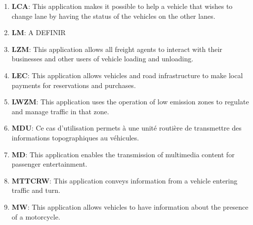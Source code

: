 \begin{enumerate}
\item \textbf{\acrfull{LCA}}: This application makes it possible to help a vehicle that wishes to change lane by having the status of the vehicles on the other lanes. \cite{etsi_etsi_tr_102_638_intelligent_2009,papadimitratos_vehicular_2009,brown_review_2019,boban_use_2017,al-sultan_comprehensive_2014,karagiannis_vehicular_2011,chang_intelligent_2010,cailean_survey_2014,zeadally_tutorial_2020,bila_vehicles_2017,usdt_intelligent_2021}
\item \textbf{\acrfull{LM}}: A DEFINIR \cite{dar_wireless_2010,usdt_intelligent_2021}
\item \textbf{\acrfull{LZM}}: This application allows all freight agents to interact with their businesses and other users of vehicle loading and unloading. \cite{etsi_etsi_tr_102_638_intelligent_2009}
\item \textbf{\acrfull{LEC}}: This application allows vehicles and road infrastructure to make local payments for reservations and purchases. \cite{etsi_etsi_tr_102_638_intelligent_2009}
\item \textbf{\acrfull{LWZM}}: This application uses the operation of low emission zones to regulate and manage traffic in that zone. \cite{usdt_intelligent_2021,chang_estimated_2015}
\item \textbf{\acrfull{MDU}}: Ce cas d'utilisation permets à une unité routière de transmettre des informations topographiques au véhicules. \cite{etsi_etsi_tr_102_638_intelligent_2009,papadimitratos_vehicular_2009,ngmn_alliance_perspectives_2016,hussain_autonomous_2019}
\item \textbf{\acrlong{MD}}: This application enables the transmission of multimedia content for passenger entertainment. \cite{etsi_etsi_tr_102_638_intelligent_2009,papadimitratos_vehicular_2009,etsi_tr_102_863_intelligent_2011,xu_dsrc_2017,ngmn_alliance_perspectives_2016,gerla_vehicular_2011}
\item \textbf{\acrfull{MTTCRW}}: This application conveys information from a vehicle entering traffic and turn. \cite{etsi_etsi_tr_102_638_intelligent_2009,j_vehicle--vehicle_2014,wu_evaluation_2018}
\item \textbf{\acrfull{MW}}: This application allows vehicles to have information about the presence of a motorcycle. \cite{etsi_etsi_tr_102_638_intelligent_2009,connected_motorcycle_consortium_applications_2021}

\end{enumerate}
